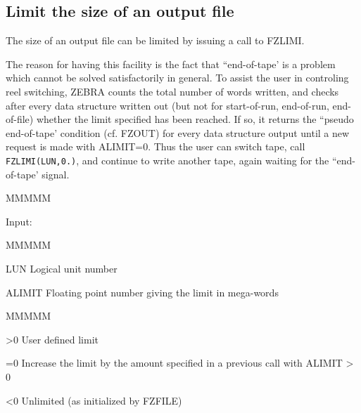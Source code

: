 \subsection{Limit the size of an output file}
\par The size of an output file can be limited by issuing a call to FZLIMI.
\par
The reason for having this facility is the fact that ``end-of-tape'
is a problem which cannot be solved satisfactorily in general.
To assist the user in controling reel switching,
ZEBRA counts the total number of words written,
and checks after every data structure written out
(but not for start-of-run, end-of-run, end-of-file)
whether the limit specified has been reached.
If so, it returns the ``pseudo end-of-tape' condition (cf. FZOUT)
for every data structure output until a new request is made
with ALIMIT=0. Thus the user can switch tape, call
{\tt FZLIMI(LUN,0.)},
and continue to write another tape,
again waiting for the ``end-of-tape' signal.
\begin{DL}{MMMMM}
\item[Input:
]
\begin{DL}{MMMMM}
\item[LUN
]Logical unit number
\item[ALIMIT
]Floating point number giving the limit in mega-words
\begin{DL}{MMMMM}
\item[>0
]User defined limit
\item[=0
]Increase the limit by the amount specified in a previous call
with ALIMIT > 0
\item[<0
]Unlimited (as initialized by FZFILE)
\end{DL}
\end{DL}
\end{DL}
